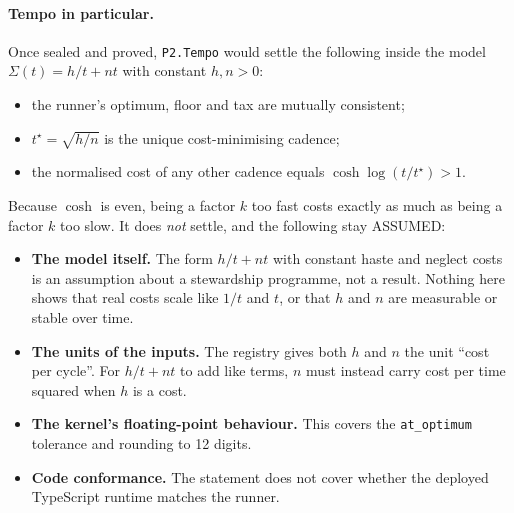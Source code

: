 \documentclass[11pt]{article}
\theoremstyle{definition}
\theoremstyle{remark}
\begin{document}
\paragraph{Tempo in particular.} Once sealed and proved, \texttt{P2.Tempo} would settle the following inside the model
$\Sigma(t)=h/t+nt$ with constant $h,n>0$:
\begin{itemize}
\item the runner's optimum, floor and tax are mutually consistent;
\item $t^\star=\sqrt{h/n}$ is the unique cost-minimising cadence;
\item the normalised cost of any other cadence equals $\cosh\log(t/t^\star)>1$.
\end{itemize}
Because $\cosh$ is even, being a factor $k$ too fast costs exactly as much as being a factor $k$ too slow.
It does \emph{not} settle, and the following stay ASSUMED:
\begin{itemize}
\item \textbf{The model itself.} The form $h/t+nt$ with constant haste and neglect costs is an assumption about a
stewardship programme, not a result. Nothing here shows that real costs scale like $1/t$ and $t$, or that $h$ and $n$ are
measurable or stable over time.
\item \textbf{The units of the inputs.} The registry gives both $h$ and $n$ the unit ``cost per cycle''. For $h/t+nt$ to add like
terms, $n$ must instead carry cost per time squared when $h$ is a cost.
\item \textbf{The kernel's floating-point behaviour.} This covers the \texttt{at\_optimum} tolerance and rounding to 12 digits.
\item \textbf{Code conformance.} The statement does not cover whether the deployed TypeScript runtime matches the runner.
\end{itemize}
\end{document}
